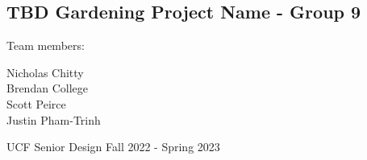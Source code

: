 \begin{titlepage}
    \begin{center}
        \section*{TBD Gardening Project Name - Group 9}
        \begin{Large}
            Team members:\\
            \vspace{.5cm}
        \end{Large}
        \begin{large}
            Nicholas Chitty \\
            Brendan College \\
            Scott Peirce \\
            Justin Pham-Trinh \\
        \end{large}
        \vfill
        UCF Senior Design Fall 2022 - Spring 2023

        \pagebreak
    \end{center}
\end{titlepage}